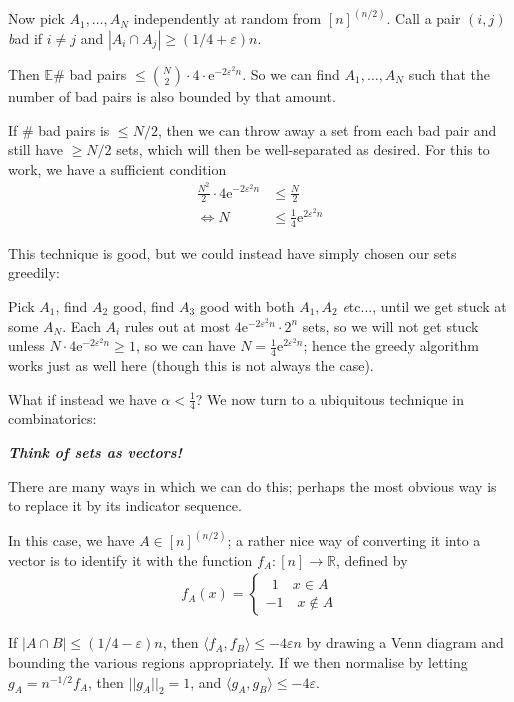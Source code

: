 \documentclass[]{article}
\theoremstyle{custhm}
\theoremstyle{cusdef}
\theoremstyle{custhm}
\theoremstyle{custhm}
\theoremstyle{custhm}
\theoremstyle{custhm}
\theoremstyle{cusdef}
\theoremstyle{remark}
\theoremstyle{custhm}
\newcommand{\R}{\mathbb{R}}
\newcommand{\e}{\mathrm{e}}
\newcommand{\ra}{\rightarrow}
\newcommand{\eps}{\varepsilon}
\newcommand{\E}{\mathbb{E}}
\newcommand{\undf}[1]{\textit{\textbf{#1}}}
\renewcommand{\it}[1]{\textit{#1}}
\begin{document}
Now pick $A_1,\dots,A_N$ independently at random from $[n]^{(n/2)}$. Call a pair $(i,j)$ {\it bad} if $i\ne j$ and $|A_i\cap A_j| \ge (1/4+\eps)n$.

Then $\E$\# bad pairs $\le \binom{N}{2}\cdot 4\cdot \e^{-2\eps^2 n}$. So we can find $A_1,\dots,A_N$ such that the number of bad pairs is also bounded by that amount.

If \# bad pairs is $\le N/2$, then we can throw away a set from each bad pair and still have $\ge N/2$ sets, which will then be well-separated as desired. For this to work, we have a sufficient condition
\begin{align*}
	\frac{N^2}{2}\cdot 4\e^{-2\eps^2n}&\le \frac{N}{2}\\
\iff N &\le \frac{1}{4}\e^{2\eps^2 n}
\end{align*}

This technique is good, but we could instead have simply chosen our sets greedily:

Pick $A_1$, find $A_2$ good, find $A_3$ good with both $A_1,A_2$ {\it etc...}, until we get stuck at some $A_N$. Each $A_i$ rules out at most $4\e^{-2\eps^2n}\cdot 2^n$ sets, so we will not get stuck unless $N\cdot 4\e^{-2\eps^2 n} \ge 1$, so we can have $N = \frac{1}{4}\e^{2\eps^2n}$; hence the greedy algorithm works just as well here (though this is not always the case).

What if instead we have $\alpha < \frac{1}{4}$? We now turn to a ubiquitous technique in combinatorics:

\undf{Think of sets as vectors!}

There are many ways in which we can do this; perhaps the most obvious way is to replace it by its indicator sequence.

In this case, we have $A \in [n]^{(n/2)}$; a rather nice way of converting it into a vector is to identify it with the function $f_A: [n]\ra\R$, defined by
\begin{align*}
	f_A(x) = \left\lbrace \begin{array}{c}\ \ 1\quad x\in A\\ -1\quad x\not\in A\end{array}\right.
\end{align*}

If $|A\cap B| \le (1/4 - \eps)n$, then $\langle f_A,f_B\rangle \le -4\eps n$ by drawing a Venn diagram and bounding the various regions appropriately. If we then normalise by letting $g_A = n^{-1/2}f_A$, then $||g_A||_2 = 1$, and $\langle g_A,g_B\rangle \le -4\eps$.
\end{document}

